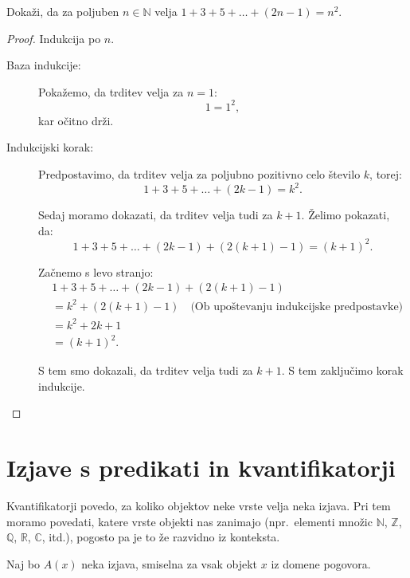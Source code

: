 \documentclass[11pt,paper=b5,DIV=13,headinclude,footinclude]{scrbook}
\newcounter{example}
\begin{document}
\begin{example*}
    Dokaži, da za poljuben $n\in \mathbb N$ velja $1 + 3 + 5 + \ldots + (2n-1) = n^2$.

\begin{proof}
Indukcija po $n$.
\begin{description}
    \item[Baza indukcije:] Pokažemo, da trditev velja za $n = 1$:
\[
1 = 1^2,
\]
kar očitno drži.
\item[Indukcijski korak:]Predpostavimo, da trditev velja za poljubno pozitivno celo število $k$, torej:
\[
1 + 3 + 5 + \ldots + (2k-1) = k^2.
\]

Sedaj moramo dokazati, da trditev velja tudi za $k+1$. Želimo pokazati, da:
\[
1 + 3 + 5 + \ldots + (2k-1) + (2(k+1)-1) = (k+1)^2.
\]

Začnemo s levo stranjo:
\begin{align*}
&1 + 3 + 5 + \ldots + (2k-1) + (2(k+1)-1) \\
&= k^2 + (2(k+1) - 1) \quad \text{(Ob upoštevanju indukcijske predpostavke)} \\
&= k^2 + 2k + 1 \\
&= (k+1)^2.
\end{align*}

S tem smo dokazali, da trditev velja tudi za $k+1$. S tem zaključimo korak indukcije.

\end{description}

\end{proof}
\end{example*}
\pagebreak
\section{Izjave s predikati in kvantifikatorji}

Kvantifikatorji povedo, za koliko objektov neke vrste velja neka izjava.
Pri tem moramo povedati, katere vrste objekti nas zanimajo (npr.~elementi množic $\mathbb{N}$, $\mathbb{Z}$, $\mathbb{Q}$, $\mathbb{R}$, $\mathbb{C}$, itd.), pogosto pa je to že razvidno iz konteksta.

Naj bo $A(x)$ neka izjava, smiselna za vsak objekt $x$ iz domene pogovora.
\iftoggle{long}{
{\color{blue}Taki izjavi pravimo \emph{ predikat}.
Predikati oblike $A(x)$ so enomestni. Poznamo pa tudi dvo- in večmestne predikate, npr.~$A(x,y)$, $P(x_1,x_2,x_3)$ ipd.}
}
{Taki izjavi pravimo \emph{ predikat}. Predikati oblike $A(x)$ so enomestni. Poznamo pa tudi dvo- in večmestne predikate, npr.~$A(x,y)$, $P(x_1,x_2,x_3)$ ipd.}
\end{document}

